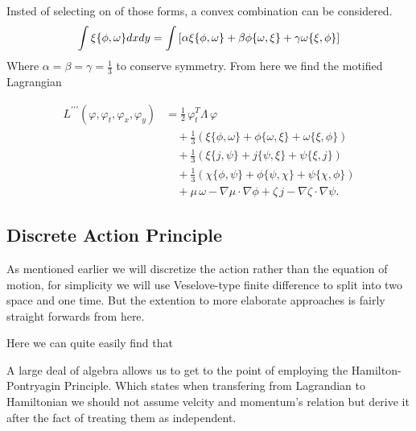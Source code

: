 Insted of selecting on of those forms, a convex combination can be considered.
\[
	\int \xi \pb{\phi}{\omega} dx dy = \int \left[\alpha \xi \pb{\phi}{\omega} + \beta \phi \pb{\omega}{\xi} + \gamma \omega \pb{\xi}{\phi}   \right]
\]
Where $\alpha = \beta = \gamma = \frac{1}{3}$ to conserve symmetry. From here we find the motified Lagrangian

\begin{align}
	L^{\prime\prime\prime}(\varphi, \varphi_t, \varphi_x, \varphi_y)
	 & = \frac{1}{2}\,\varphi_t^{T}\Lambda\,\varphi   \\
	 & \quad + \frac{1}{3}\left(
	\xi\{\phi,\omega\} + \phi\{\omega,\xi\} + \omega\{\xi,\phi\}
	\right)                                           \\
	 & \quad + \frac{1}{3}\left(
	\xi\{j,\psi\} + j\{\psi,\xi\} + \psi\{\xi,j\}
	\right)                                           \\
	 & \quad + \frac{1}{3}\left(
	\chi\{\phi,\psi\} + \phi\{\psi,\chi\} + \psi\{\chi,\phi\}
	\right)                                           \\
	 & \quad + \mu\,\omega - \nabla\mu\cdot\nabla\phi
	+ \zeta\,j - \nabla\zeta\cdot\nabla\psi .
\end{align}


\subsection{Discrete Action Principle}

As mentioned earlier we will discretize the action rather than the equation of motion, for simplicity we will use Veselove-type finite difference to split into two space and one time. But the extention to more elaborate approaches is fairly straight forwards from here.

Here we can quite easily find that

A large deal of algebra allows us to get to the point of employing the Hamilton-Pontryagin Principle. Which states when transfering from Lagrandian to Hamiltonian we should not assume velcity and momentum's relation but derive it after the fact of treating them as independent.

